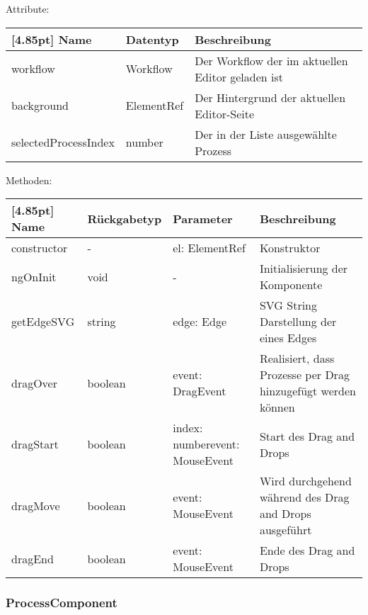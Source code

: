 				Attribute:
				\begin{center}
					\renewcommand{\arraystretch}{1.5}
					\setlength\tabcolsep{5pt}
					\begin{tabularx}{\textwidth}{|l|l|X|}
						\hline
						\rowcolor[gray]{0.75}[4.85pt]					
						Name & Datentyp & Beschreibung \\ \hline
						workflow & Workflow & Der Workflow der im aktuellen Editor geladen ist \\ \hline
						background & ElementRef & Der Hintergrund der aktuellen Editor-Seite \\ \hline
						selectedProcessIndex & number & Der in der Liste ausgewählte Prozess \\ \hline
					\end{tabularx}
				\end{center}
				\newpage
				Methoden:
				\begin{center}
				\setlength\tabcolsep{5pt}
					\renewcommand{\arraystretch}{1.5}
						\begin{tabularx}{\textwidth}{|l|l|p{35mm}|X|}
						\hline
						\rowcolor[gray]{0.75}[4.85pt]
						Name & Rückgabetyp & Parameter & Beschreibung \\ \hline
						constructor & - & el: ElementRef & Konstruktor \\ \hline
						ngOnInit & void & - & Initialisierung der Komponente \\ \hline
						getEdgeSVG & string & edge: Edge & SVG String Darstellung der eines Edges  \\ \hline
						dragOver & boolean & event: DragEvent & Realisiert, dass Prozesse per Drag hinzugefügt werden können \\ \hline
						dragStart & boolean & index: number\newline event: MouseEvent & Start des Drag and Drops \\ \hline
						dragMove & boolean & event: MouseEvent & Wird durchgehend während des Drag and Drops ausgeführt \\ \hline
						dragEnd & boolean & event: MouseEvent & Ende des Drag and Drops \\ \hline
						\end{tabularx}
				\end{center}
			
			\subsubsection{ProcessComponent}
			

